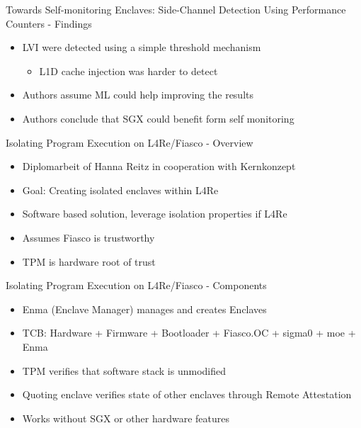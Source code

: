 \documentclass[aspectratio=169]{beamer}
\begin{document}
\begin{frame}{Towards Self-monitoring Enclaves: Side-Channel Detection Using Performance Counters - Findings}
    \begin{itemize}
        \item LVI were detected using a simple threshold mechanism
              \begin{itemize}
                  \item L1D cache injection was harder to detect
              \end{itemize}
        \item Authors assume ML could help improving the results
        \item Authors conclude that SGX could benefit form self monitoring
    \end{itemize}
\end{frame}
\begin{frame}{Isolating Program Execution on L4Re/Fiasco - Overview}
    \begin{itemize}
        \item Diplomarbeit of Hanna Reitz in cooperation with Kernkonzept
        \item Goal: Creating isolated enclaves within L4Re
        \item Software based solution, leverage isolation properties if L4Re
        \item Assumes Fiasco is trustworthy
        \item TPM is hardware root of trust
    \end{itemize}
\end{frame}
\begin{frame}{Isolating Program Execution on L4Re/Fiasco - Components}
    \begin{itemize}
        \item Enma (Enclave Manager) manages and creates Enclaves
        \item TCB: Hardware + Firmware + Bootloader + Fiasco.OC + sigma0 + moe + Enma
        \item TPM verifies that software stack is unmodified
        \item Quoting enclave verifies state of other enclaves through Remote Attestation
        \item Works without SGX or other hardware features
    \end{itemize}
\end{frame}
\end{document}
